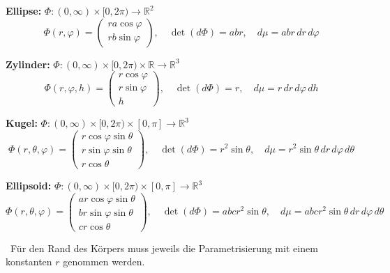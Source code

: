 \textbf{Ellipse:} $\Phi : (0, \infty) \times [0, 2\pi) \to \mathbb{R}^2$
\[
\Phi(r, \varphi) = \begin{pmatrix} ra\cos\varphi \\ rb\sin\varphi \end{pmatrix}, \quad
\det(d\Phi) = abr, \quad
d\mu = abr\,dr\,d\varphi
\]

\textbf{Zylinder:} $\Phi : (0, \infty) \times [0, 2\pi) \times \mathbb{R} \to \mathbb{R}^3$
\[
\Phi(r, \varphi, h) = \begin{pmatrix} r\cos\varphi \\ r\sin\varphi \\ h \end{pmatrix}, \quad
\det(d\Phi) = r, \quad
d\mu = r\,dr\,d\varphi\,dh
\]

\textbf{Kugel:} $\Phi : (0, \infty) \times [0, 2\pi) \times [0, \pi] \to \mathbb{R}^3$
\[
\Phi(r, \theta, \varphi) =
\begin{pmatrix}
r\cos\varphi\sin\theta \\
r\sin\varphi\sin\theta \\
r\cos\theta
\end{pmatrix}, \quad
\det(d\Phi) = r^2\sin\theta, \quad
d\mu = r^2\sin\theta\,dr\,d\varphi\,d\theta
\]

\textbf{Ellipsoid:} $\Phi : (0, \infty) \times [0, 2\pi) \times [0, \pi] \to \mathbb{R}^3$
\[
\Phi(r, \theta, \varphi) =
\begin{pmatrix}
ar\cos\varphi\sin\theta \\
br\sin\varphi\sin\theta \\
cr\cos\theta
\end{pmatrix}, \quad
\det(d\Phi) = abcr^2\sin\theta, \quad
d\mu = abcr^2\sin\theta\,dr\,d\varphi\,d\theta
\]

\vspace{1em}
\noindent
{\textbullet\ Für den Rand des Körpers muss jeweils die Parametrisierung mit einem konstanten \( r \) genommen werden.}



